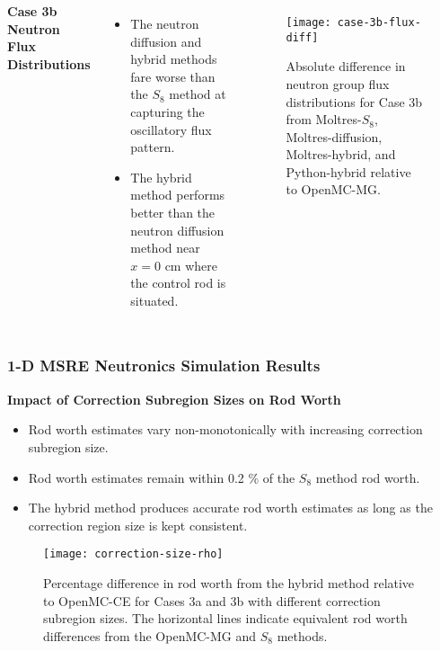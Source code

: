 \begin{frame}
  \begin{columns}
    \column{5.5cm}
    \textbf{Case 3b Neutron Flux Distributions}
    \begin{itemize}
      \item The neutron diffusion and hybrid methods fare worse than the $S_8$ method at capturing
        the oscillatory flux pattern.
      \item The hybrid method performs better than the neutron diffusion method near $x=0$ cm where
        the control rod is situated.
    \end{itemize}
    \column{5.5cm}
    \begin{figure}[htb!]
      \centering
      \texttt{[image: case-3b-flux-diff]}
      \caption{Absolute difference in neutron group flux distributions for Case 3b from Moltres-$S_8$,
      Moltres-diffusion, Moltres-hybrid, and Python-hybrid relative to OpenMC-MG.}
      \label{fig:3b-flux-diff}
    \end{figure}
  \end{columns}
\end{frame}

\begin{frame}
  \frametitle{1-D MSRE Neutronics Simulation Results}
  \textbf{Impact of Correction Subregion Sizes on Rod Worth}
  \begin{itemize}
    \item Rod worth estimates vary non-monotonically with increasing correction subregion size.
    \item Rod worth estimates remain within 0.2 \% of the $S_8$ method rod worth.
    \item The hybrid method produces accurate rod worth estimates as long as the correction region
      size is kept consistent.
  \end{itemize}
  \begin{figure}[htb!]
    \centering
    \texttt{[image: correction-size-rho]}
    \caption{Percentage difference in rod worth from the hybrid method relative to OpenMC-CE for
      Cases 3a and 3b with different correction subregion sizes. The horizontal lines indicate
      equivalent rod worth differences from the OpenMC-MG and $S_8$ methods.}
    \label{fig:v1-size-rho}
  \end{figure}
\end{frame}

